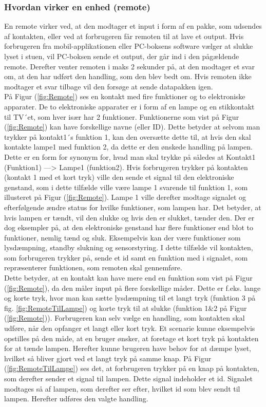 \subsubsection{Hvordan virker en enhed (remote)} En remote virker ved, at den modtager et input i form af en pakke, som udsendes af kontakten, eller ved at forbrugeren får remoten til at lave et output.  Hvis forbrugeren fra mobil-applikationen eller PC-boksens software vælger at slukke lyset i stuen, vil PC-boksen sende et output, der går ind i den pågældende remote. Derefter venter remoten i maks 2 sekunder på, at den modtager et svar om, at den har udført den handling, som den blev bedt om. Hvis remoten ikke modtager et svar tilbage vil den forsøge at sende datapakken igen.\\  På Figur (\ref{fig:Remote}) ses en kontakt med fire funktioner og to elektroniske apparater. De to elektroniske apparater er i form af en lampe og en stikkontakt til TV´et, som hver især har 2 funktioner. 
Funktionerne som vist på Figur (\ref{fig:Remote}) kan have forskellige navne (eller ID). Dette betyder at selvom man trykker på kontakt1´s funktion 1, kan den oversætte dette til, at hvis den skal kontakte lampe1 med funktion 2, da dette er den ønskede handling på lampen.
Dette er en form for synonym for, hvad man skal trykke på således at Kontakt1 (Funktion1) ---> Lampe1 (funktion2).
Hvis forbrugeren trykker på kontakten (kontakt 1 med et kort tryk) ville den sende et signal til den elektroniske genstand, som i dette tilfælde ville være lampe 1 svarende til funktion 1, som illusteret på Figur (\ref{fig:Remote}). Lampe 1 ville derefter modtage signalet og efterfølgende ændre status for hvilke funktioner, som lampen har. Det betyder, at hvis lampen er tændt, vil den slukke og hvis den er slukket, tænder den. Der er dog eksempler på, at den elektroniske genstand har flere funktioner end blot to funktioner, nemlig tænd og sluk. Eksempelvis kan der være funktioner som lysdæmpning, standby slukning og sensorstyring. I dette tilfælde vil kontakten, som forbrugeren trykker på, sende et id samt en funktion med i signalet, som repræsenterer funktionen, som remoten skal gennemføre.\\ Dette betyder, at en kontakt kan have mere end en funktion som vist på Figur (\ref{fig:Remote}), da den måler input på flere forskellige måder. Dette er f.eks. lange og korte tryk, hvor man kan sætte lysdæmpning til et langt tryk (funktion 3 på fig. \ref{fig:RemoteTilLampe}) og korte tryk til at slukke (funktion 1\&2 på Figur (\ref{fig:Remote})). Forbrugeren kan selv vælge en handling, som kontakten skal udføre, når den opfanger et langt eller kort tryk. Et scenarie kunne eksempelvis opstilles på den måde, at en bruger ønsker, at foretage et kort tryk på kontakten for at tænde lampen. Herefter kunne brugeren have behov for at dæmpe lyset, hvilket så bliver gjort ved et langt tryk på samme knap.  På Figur (\ref{fig:RemoteTilLampe}) ses det, at forbrugeren trykker på en knap på kontakten, som derefter sender et signal til lampen. Dette signal indeholder et id. Signalet modtages så af lampen, som derefter ser efter, hvilket id som blev sendt til lampen. Herefter udføres den valgte handling.
